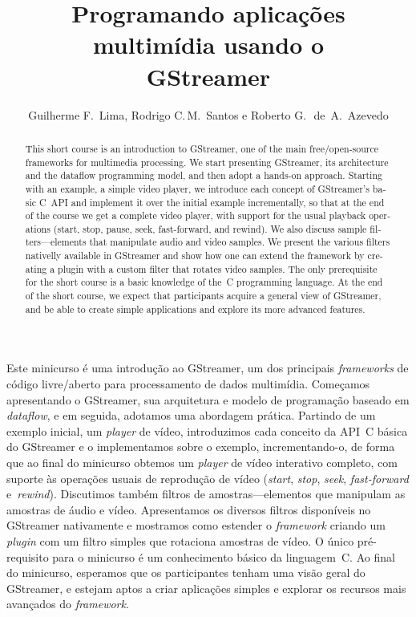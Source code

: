 \documentclass{SBCbookchapter}
\title{Programando aplicações multimídia usando o\\GStreamer}
\author{Guilherme F.~Lima, Rodrigo C.\,M.~Santos e Roberto
G.\,~de~A.~Azevedo}
\begin{document}
\maketitle
\begin{abstract}
\begin{otherlanguage}{english}
This short course is an introduction to GStreamer, one of the main
free/open-source frameworks for multimedia processing.  We start presenting
GStreamer, its architecture and the dataflow programming model, and then adopt
a hands-on approach.  Starting with an example, a simple video player, we
introduce each concept of GStreamer's basic C~API and implement it over the
initial example incrementally, so that at the end of the course we get a
complete video player, with support for the usual playback operations
(start, stop, pause, seek, fast-forward, and rewind).  We also discuss
sample filters---elements that manipulate audio and video samples.  We
present the various filters nativelly available in GStreamer and show how one
can extend the framework by creating a plugin with a custom filter that rotates
video samples.  The only prerequisite for the short course is a basic knowledge
of the~C programming language.  At the end of the short course, we expect that
participants acquire a general view of GStreamer, and be able to create
simple applications and explore its more advanced features.
\end{otherlanguage}
\end{abstract}

\begin{resumo}
Este minicurso é uma introdução ao GStreamer, um dos principais
\emph{frameworks} de código livre/aberto para processamento de dados
multimídia.  Começamos apresentando o GStreamer, sua arquitetura e modelo de
programação baseado em \emph{dataflow}, e em seguida, adotamos uma abordagem
prática.  Partindo de um exemplo inicial, um \emph{player} de vídeo,
introduzimos cada conceito da API~C básica do GStreamer e o implementamos
sobre o exemplo, incrementando-o, de forma que ao final do minicurso obtemos
um \emph{player} de vídeo interativo completo, com suporte às
operações usuais de reprodução de vídeo (\emph{start}, \emph{stop},
\emph{seek}, \emph{fast-forward} e~\emph{rewind}).  Discutimos também filtros
de amostras---elementos que manipulam as amostras de áudio e vídeo.
Apresentamos os diversos filtros disponíveis no GStreamer nativamente e
mostramos como estender o \emph{framework} criando um \emph{plugin} com um
filtro simples que rotaciona amostras de vídeo.  O único pré-requisito para o
minicurso é um conhecimento básico da linguagem~C.  Ao final do minicurso,
esperamos que os participantes tenham uma visão geral do GStreamer, e estejam
aptos a criar aplicações simples e explorar os recursos mais avançados do
\emph{framework}.

\end{resumo}
\end{document}
